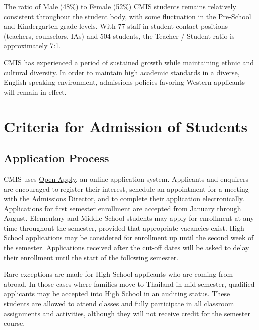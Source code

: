 

The ratio of Male (48\%) to Female (52\%) CMIS students remains relatively consistent throughout the student body, with some fluctuation in the Pre-School and Kindergarten grade levels.   With 77 staff in student contact positions (teachers, counselors, IAs) and 504 students, the Teacher / Student ratio is approximately 7:1.  



CMIS has experienced a period of sustained growth while maintaining ethnic and cultural diversity.  In order to maintain high academic standards in a diverse, English-speaking environment, admissions policies favoring Western applicants will remain in effect.  

\section{Criteria for Admission of Students}

\subsection{Application Process}

CMIS uses \href{https://cmis.openapply.com/}{Open Apply}, an online application system.  Applicants and enquirers are encouraged to register their interest, schedule an appointment for a meeting with the Admissions Director, and to complete their application electronically.  Applications for first semester enrollment are accepted from January through August.  Elementary and Middle School students may apply for enrollment at any time throughout the semester, provided that appropriate vacancies exist.  High School applications may be considered for enrollment up until the second week of the semester.  Applications received after the cut-off dates will be asked to delay their enrollment until the start of the following semester.  

Rare exceptions are made for High School applicants who are coming from abroad.  In those cases where families move to Thailand in mid-semester, qualified applicants may be accepted into High School in an auditing status.  These students are allowed to attend classes and fully participate in all classroom assignments and activities, although they will not receive credit for the semester course.  


